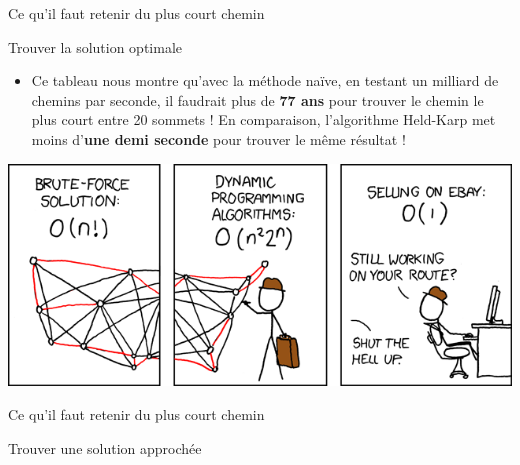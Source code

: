 \begin{frame}{Ce qu'il faut retenir du plus court chemin}
\begin{block}{Trouver la solution optimale}
\begin{itemize}
      \bigskip

      \item Ce tableau nous montre qu'avec la méthode naïve, en testant un milliard de chemins par seconde, il faudrait plus de \textbf{77 ans} pour trouver le chemin le plus court entre 20 sommets ! En comparaison, l'algorithme Held-Karp met moins d'\textbf{une demi seconde} pour trouver le même résultat !
    \end{itemize}
  \end{block}

  \begin{center}
    \includegraphics[width=0.8\linewidth]{img/tsp_xkcd.png}
  \end{center}

\end{frame}

\begin{frame}{Ce qu'il faut retenir du plus court chemin}

  \begin{block}{Trouver une solution approchée}


  \end{block}

\end{frame}

